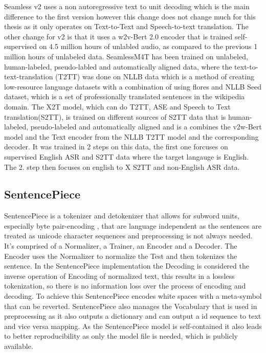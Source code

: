 Seamless v2 uses a non autoregressive text to unit decoding which is the main difference to the first version however this change does not change much for this thesis as it only operates on Text-to-Text and Speech-to-text translation. 
The other change for v2 is that it uses a w2v-Bert 2.0 \cite{chung2021w2vbertcombiningcontrastivelearning} encoder that is trained self-supervised on 4.5 million hours of unlabled audio, as compared to the previous 1 million hours of unlabeled data. 
SeamlessM4T has been trained on unlabeled, human-labeled, pseudo-labled and automatically aligned data, where the text-to-text-translation (T2TT) was done on NLLB data \cite{nllbteam2022languageleftbehindscaling}
which is a method of creating low-resource language datasets with a combination of using flores \cite{guzmán2019floresevaluationdatasetslowresource} and NLLB Seed dataset, which is a set of professionally translated sentences in the wikipedia domain. 
The X2T model, which can do T2TT, ASE and Speech to Text translation(S2TT), is trained on different sources of S2TT data that is human-labeled, pseudo-labeled and automatically aligned and is a combines the v2w-Bert model and the Text encoder from the NLLB T2TT model and the corresponding decoder.
It was trained in 2 steps on this data, the first one forcuses on supervised English ASR and S2TT data where the target langauge is English. 
The 2. step then focuses on english to X S2TT and non-English ASR data.


\subsection{SentencePiece}
SentencePiece \cite{kudo-richardson-2018-sentencepiece} is a tokenizer and detokenizer that allows for subword units, especially byte pair-encoding \cite{sennrich-etal-2016-neural}, that are language independent as the sentences are treated as unicode character sequences and preprocessing is not always needed. 
It's comprised of a Normalizer, a Trainer, an Encoder and a Decoder. 
The Encoder uses the Normalizer to normalize the Test and then tokenizes the sentence. 
In the SentencePiece implementation the Decoding is considered the inverse operation of Encoding of normalized text, this results in a lossless tokenization, so there is no information loss over the process of encoding and decoding. 
To achieve this SentencePiece encodes white spaces with a meta-symbol that can be reverted. 
SentencePiece also manages the Vocabulary that is used in preprocessing as it also outputs a dictionary and can output a id sequence to text and vice versa mapping. 
As the SentencePiece model is self-contained it also leads to better reproducibility as only the model file is needed, which is publicly available. 

